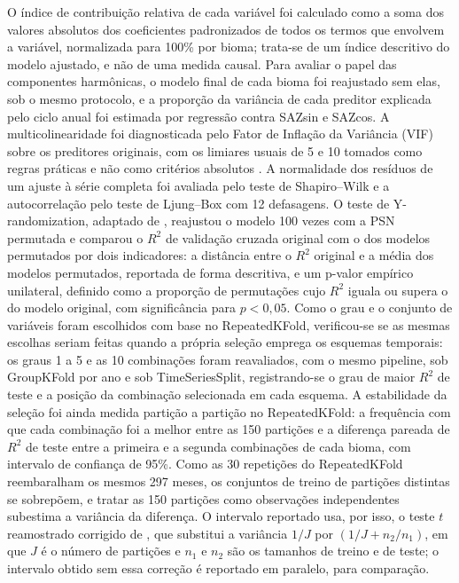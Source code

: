 \documentclass[a4paper,fleqn]{cas-dc}
\begin{document}
O índice de contribuição relativa de cada variável foi calculado como a soma dos valores absolutos dos coeficientes padronizados de todos os termos que envolvem a variável, normalizada para 100\% por bioma; trata-se de um índice descritivo do modelo ajustado, e não de uma medida causal. Para avaliar o papel das componentes harmônicas, o modelo final de cada bioma foi reajustado sem elas, sob o mesmo protocolo, e a proporção da variância de cada preditor explicada pelo ciclo anual foi estimada por regressão contra SAZsin e SAZcos. A multicolinearidade foi diagnosticada pelo Fator de Inflação da Variância (VIF) sobre os preditores originais, com os limiares usuais de 5 e 10 tomados como regras práticas e não como critérios absolutos \citep{obrien2007}. A normalidade dos resíduos de um ajuste à série completa foi avaliada pelo teste de Shapiro--Wilk e a autocorrelação pelo teste de Ljung--Box com 12 defasagens. O teste de Y-randomization, adaptado de \citet{guimaraes2024}, reajustou o modelo 100 vezes com a PSN permutada e comparou o $R^2$ de validação cruzada original com o dos modelos permutados por dois indicadores: a distância entre o $R^2$ original e a média dos modelos permutados, reportada de forma descritiva, e um p-valor empírico unilateral, definido como a proporção de permutações cujo $R^2$ iguala ou supera o do modelo original, com significância para $p < 0,05$. Como o grau e o conjunto de variáveis foram escolhidos com base no RepeatedKFold, verificou-se se as mesmas escolhas seriam feitas quando a própria seleção emprega os esquemas temporais: os graus 1 a 5 e as 10 combinações foram reavaliados, com o mesmo pipeline, sob GroupKFold por ano e sob TimeSeriesSplit, registrando-se o grau de maior $R^2$ de teste e a posição da combinação selecionada em cada esquema. A estabilidade da seleção foi ainda medida partição a partição no RepeatedKFold: a frequência com que cada combinação foi a melhor entre as 150 partições e a diferença pareada de $R^2$ de teste entre a primeira e a segunda combinações de cada bioma, com intervalo de confiança de 95\%. Como as 30 repetições do RepeatedKFold reembaralham os mesmos 297 meses, os conjuntos de treino de partições distintas se sobrepõem, e tratar as 150 partições como observações independentes subestima a variância da diferença. O intervalo reportado usa, por isso, o teste $t$ reamostrado corrigido de \citet{nadeau2003}, que substitui a variância $1/J$ por $(1/J + n_2/n_1)$, em que $J$ é o número de partições e $n_1$ e $n_2$ são os tamanhos de treino e de teste; o intervalo obtido sem essa correção é reportado em paralelo, para comparação.
\end{document}
